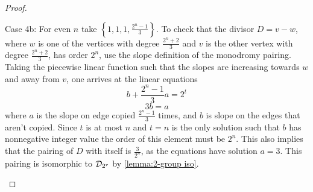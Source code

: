 \documentclass{amsart}
\begin{document}
\begin{proof}
\begin{center}
\end{center}
    
    Case 4b: For even $n$ take $\left\{1, 1, 1,
\frac{2^{n}-1}{3}\right\}$. To check that the divisor $D=v-w$,
where $w$ is one of the vertices with degree $\frac{2^{n}+2}{3}$
and $v$ is the other vertex with degree $\frac{2^{n}+2}{3}$, has
order $2^{n}$, use the slope definition of the monodromy pairing. Taking the piecewise linear function such that the slopes are increasing towards $w$ and away from $v$, one arrives at the linear equations
\begin{equation*}
b+ \frac{2^{n}-1}{3}a=2^{t}
\end{equation*}
\begin{equation*}
3b=a
\end{equation*}
where $a$ is the slope on edge copied $\frac{2^{n}-1}{3}$ times, and $b$
is slope on the edges that aren't copied. Since $t$ is at most $n$ and $t=n$ is the only solution such that $b$ has nonnegative integer value the order of this element must be $2^{n}$. This also implies that the pairing of $D$ with itself is $\frac{3}{2^{n}}$, as the equations have solution $a=3$. This pairing is isomorphic to
$\mathcal{D}_{2^{r}}$ by  \ref{lemma:2-group iso}.

\begin{center}
\end{center}
\end{proof}
\end{document}
